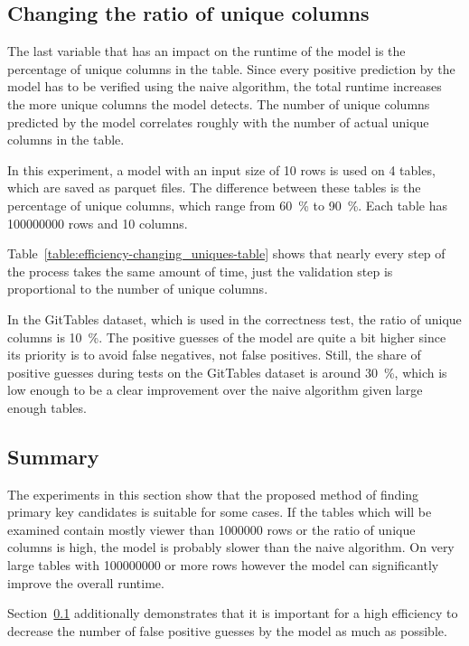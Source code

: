 


\subsection{Changing the ratio of unique columns}\label{subsec:efficiency-changing_uniques}
The last variable that has an impact on the runtime of the model is the percentage of unique columns in the table. Since every positive prediction by the model has to be verified using the naive algorithm, the total runtime increases the more unique columns the model detects. The number of unique columns predicted by the model correlates roughly with the number of actual unique columns in the table. %

In this experiment, a model with an input size of \num{10} rows is used on \num{4} tables, which are saved as parquet files. The difference between these tables is the percentage of unique columns, which range from \SI{60}{\percent} to \SI{90}{\percent}. Each table has \num{100000000} rows and \num{10} columns.

Table~\ref{table:efficiency-changing_uniques-table} shows that nearly every step of the process takes the same amount of time, just the validation step is proportional to the number of unique columns.

In the GitTables dataset, which is used in the correctness test, the ratio of unique columns is \SI{10}{\percent}. The positive guesses of the model are quite a bit higher since its priority is to avoid false negatives, not false positives. Still, the share of positive guesses during tests on the GitTables dataset is around \SI{30}{\percent}, which is low enough to be a clear improvement over the naive algorithm given large enough tables. %



\subsection{Summary}\label{subsec:efficiency-summary}
The experiments in this section show that the proposed method of finding primary key candidates is suitable for some cases. If the tables which will be examined contain mostly viewer than \num{1000000} rows or the ratio of unique columns is high, the model is probably slower than the naive algorithm. On very large tables with \num{100000000} or more rows however the model can significantly improve the overall runtime. %

Section~\ref{subsec:efficiency-changing_uniques} additionally demonstrates that it is important for a high efficiency to decrease the number of false positive guesses by the model as much as possible.
